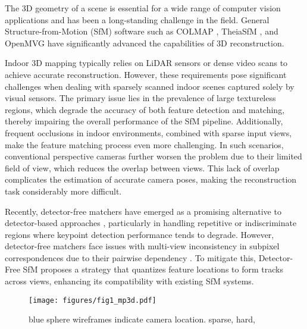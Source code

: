 The 3D geometry of a scene is essential for a wide range of computer vision applications and has been a long-standing challenge in the field.
General Structure-from-Motion (SfM) software such as COLMAP \cite{schonberger2016structure}, TheiaSfM \cite{sweeney2015theia}, and OpenMVG \cite{moulon2017openmvg} have significantly advanced the capabilities of 3D reconstruction.

Indoor 3D mapping typically relies on LiDAR sensors or dense video scans to achieve accurate reconstruction. 
However, these requirements pose significant challenges when dealing with sparsely scanned indoor scenes captured solely by visual sensors. 
The primary issue lies in the prevalence of large textureless regions, which degrade the accuracy of both feature detection and matching, thereby impairing the overall performance of the SfM pipeline. 
Additionally, frequent occlusions in indoor environments, combined with sparse input views, make the feature matching process even more challenging. 
In such scenarios, conventional perspective cameras further worsen the problem due to their limited field of view, which reduces the overlap between views. 
This lack of overlap complicates the estimation of accurate camera poses, making the reconstruction task considerably more difficult.

Recently, detector-free matchers \cite{sun2021loftr,melekhov2019dgc,truong2020glu,truong2021learning,edstedt2023dkm,edstedt2024roma} have emerged as a promising alternative to detector-based approaches \cite{detone2018superpoint,revaud2019r2d2,tyszkiewicz2020disk}, particularly in handling repetitive or indiscriminate regions where keypoint detection performance tends to degrade.
However, detector-free matchers face issues with multi-view inconsistency in subpixel correspondences due to their pairwise dependency \cite{he2024detector}.
To mitigate this, Detector-Free SfM \cite{he2024detector} proposes a strategy that quantizes feature locations to form tracks across views, enhancing its compatibility with existing SfM systems.

\begin{figure}[t]
    \centering
    \texttt{[image: figures/fig1\_mp3d.pdf]}
    \caption{blue sphere wireframes indicate camera location. sparse, hard,}
    \label{fig:introduction}
\end{figure}


